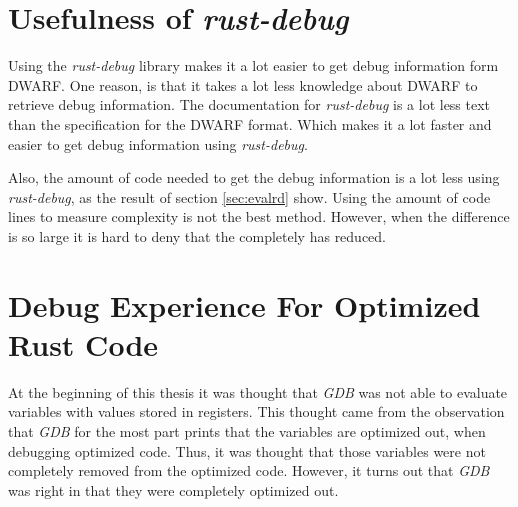 


\section{Usefulness of \emph{rust-debug}} %
Using the \emph{rust-debug} library makes it a lot easier to get debug information form \gls{DWARF}.
One reason, is that it takes a lot less knowledge about \gls{DWARF} to retrieve debug information.
The documentation for \emph{rust-debug} is a lot less text than the specification for the \gls{DWARF} format.
Which makes it a lot faster and easier to get debug information using \emph{rust-debug}.


Also, the amount of code needed to get the debug information is a lot less using \emph{rust-debug}, as the result of section \ref{sec:evalrd} show.
Using the amount of code lines to measure complexity is not the best method.
However, when the difference is so large it is hard to deny that the completely has reduced. 





\section{Debug Experience For Optimized Rust Code} %
At the beginning of this thesis it was thought that \emph{GDB} was not able to evaluate variables with values stored in registers.
This thought came from the observation that \emph{GDB} for the most part prints that the variables are optimized out, when debugging optimized code.
Thus, it was thought that those variables were not completely removed from the optimized code.
However, it turns out that \emph{GDB} was right in that they were completely optimized out.



